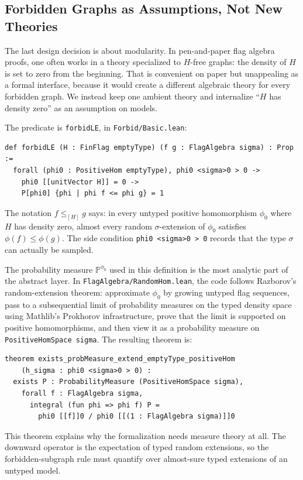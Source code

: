 \documentclass{article}
\newcommand{\lean}[1]{\texttt{#1}}
\begin{document}
\subsection{Forbidden Graphs as Assumptions, Not New Theories}
\label{sec:forbidden}

The last design decision is about modularity.  In pen-and-paper flag algebra
proofs, one often works in a theory specialized to $H$-free graphs: the density
of $H$ is set to zero from the beginning.  That is convenient on paper but
unappealing as a formal interface, because it would create a different
algebraic theory for every forbidden graph.  We instead keep one ambient theory
and internalize ``$H$ has density zero'' as an assumption on models.

The predicate is \lean{forbidLE}, in \lean{Forbid/Basic.lean}:
\begin{lstlisting}
def forbidLE (H : FinFlag emptyType) (f g : FlagAlgebra sigma) : Prop :=
  forall (phi0 : PositiveHom emptyType), phi0 <sigma>0 > 0 ->
    phi0 [[unitVector H]] = 0 ->
    P[phi0] {phi | phi f <= phi g} = 1
\end{lstlisting}
The notation $f \leq_{[H]} g$ says: in every untyped positive homomorphism
$\phi_0$ where $H$ has density zero, almost every random $\sigma$-extension of
$\phi_0$ satisfies $\phi(f)\leq\phi(g)$.  The side condition
\lean{phi0 <sigma>0 > 0} records that the type $\sigma$ can actually be
sampled.

The probability measure $\mathbb{P}^{\phi_0}$ used in this definition is
the most analytic part of the abstract layer.  In
\lean{FlagAlgebra/RandomHom.lean}, the code follows Razborov's random-extension
theorem: approximate $\phi_0$ by growing untyped flag sequences, pass to a
subsequential limit of probability measures on the typed density space using
Mathlib's Prokhorov infrastructure, prove that the limit is supported on
positive homomorphisms, and then view it as a probability measure on
\lean{PositiveHomSpace sigma}.  The resulting theorem is:
\begin{lstlisting}
theorem exists_probMeasure_extend_emptyType_positiveHom
    (h_sigma : phi0 <sigma>0 > 0) :
  exists P : ProbabilityMeasure (PositiveHomSpace sigma),
    forall f : FlagAlgebra sigma,
      integral (fun phi => phi f) P =
        phi0 [[f]]0 / phi0 [[(1 : FlagAlgebra sigma)]]0
\end{lstlisting}
This theorem explains why the formalization needs measure theory at all.  The
downward operator is the expectation of typed random extensions, so the
forbidden-subgraph rule must quantify over almost-sure typed extensions of an
untyped model.
\end{document}
